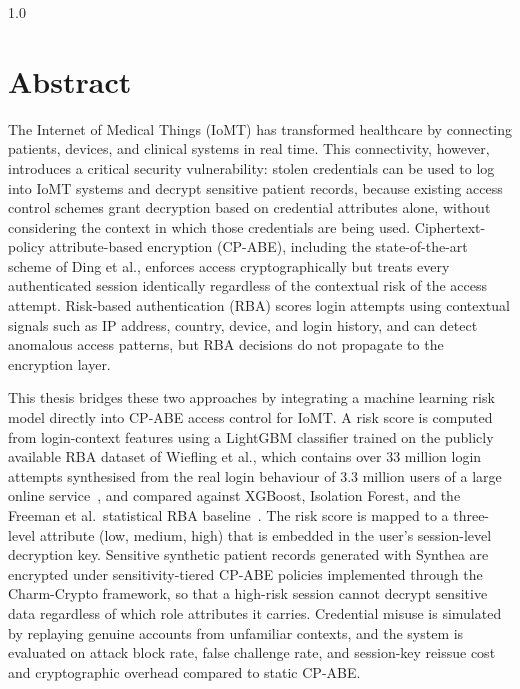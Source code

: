 \documentclass[12pt,a4paper]{report}
\numberwithin{equation}{section}
\begin{document}
\newpage
\begin{spacing}{1.0}
\normalsize{
\hypersetup{linkcolor=black}
\tableofcontents
\listoftables
}
\end{spacing}
    \newpage
    \chapter*{Abstract}
    \markboth{}{}
The Internet of Medical Things (IoMT) has transformed healthcare by connecting patients, devices, and clinical systems in real time. This connectivity, however, introduces a critical security vulnerability: stolen credentials can be used to log into IoMT systems and decrypt sensitive patient records, because existing access control schemes grant decryption based on credential attributes alone, without considering the context in which those credentials are being used. Ciphertext-policy attribute-based encryption (CP-ABE), including the state-of-the-art scheme of Ding et al., enforces access cryptographically but treats every authenticated session identically regardless of the contextual risk of the access attempt. Risk-based authentication (RBA) scores login attempts using contextual signals such as IP address, country, device, and login history, and can detect anomalous access patterns, but RBA decisions do not propagate to the encryption layer.

This thesis bridges these two approaches by integrating a machine learning risk model directly into CP-ABE access control for IoMT. A risk score is computed from login-context features using a LightGBM classifier trained on the publicly available RBA dataset of Wiefling et al., which contains over 33 million login attempts synthesised from the real login behaviour of 3.3 million users of a large online service~\cite{wiefling2023pump}, and compared against XGBoost, Isolation Forest, and the Freeman et al.\ statistical RBA baseline~\cite{freeman2016you}. The risk score is mapped to a three-level attribute (low, medium, high) that is embedded in the user's session-level decryption key. Sensitive synthetic patient records generated with Synthea are encrypted under sensitivity-tiered CP-ABE policies implemented through the Charm-Crypto framework, so that a high-risk session cannot decrypt sensitive data regardless of which role attributes it carries. Credential misuse is simulated by replaying genuine accounts from unfamiliar contexts, and the system is evaluated on attack block rate, false challenge rate, and session-key reissue cost and cryptographic overhead compared to static CP-ABE.
\end{document}

